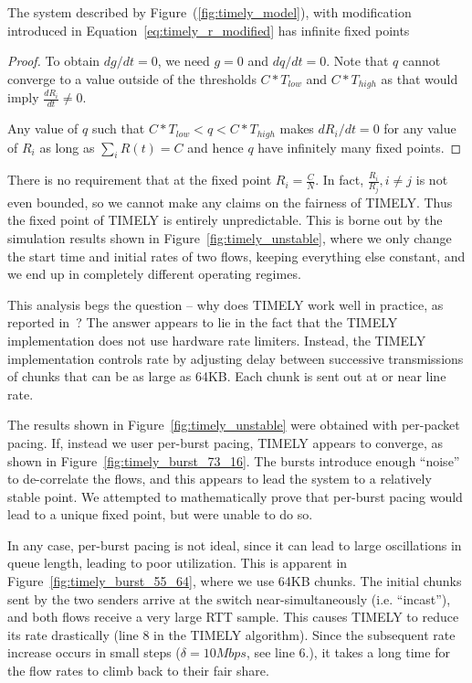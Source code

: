 \begin{thm}
The system described by Figure~(\ref{fig:timely_model}), with
modification introduced in Equation~\ref{eq:timely_r_modified} has
infinite fixed points
\end{thm}
\begin{proof}
To obtain ${dg}/{dt} =0$, we need $g = 0$ and ${dq}/{dt} = 0$.  Note that $q$
cannot converge to a value outside of the thresholds $ C*{T_{low}}$ and
$C*{T_{high}}$ as that would imply $\frac{dR_i}{dt} \ne 0$.

Any value of $q$ such that $C*T_{low} < q < C*T_{high}$ makes ${dR_i}/{dt} = 0$
for any value of $R_i$ as long as $\sum_{i} R(t) =  C$ and hence $q$ have
infinitely many fixed points. 
\end{proof}

There is no requirement that at the fixed point $R_i = \tfrac{C}{N}$. In fact,
$\tfrac{R_{i}}{R_{j}}, i \ne j$ is not even bounded, so we cannot make any
claims on the fairness of TIMELY. Thus the fixed point of TIMELY is entirely
unpredictable. This is borne out by the simulation results shown in
Figure~\ref{fig:timely_unstable}, where we only change the start time and
initial rates of two flows, keeping everything else constant, and we end up in
completely different operating regimes.

This analysis begs the question -- why does TIMELY work well in practice, as
reported in~\cite{timely}? The answer appears to lie in the fact that the TIMELY
implementation does not use hardware rate limiters.  Instead, the TIMELY
implementation controls rate by adjusting delay between successive transmissions
of chunks that can be as large as 64KB. Each chunk is sent out at or near line rate.

The results shown in Figure~\ref{fig:timely_unstable} were obtained with
per-packet pacing. If, instead we user per-burst pacing, TIMELY appears to
converge, as shown in Figure~\ref{fig:timely_burst_73_16}. The bursts introduce
enough ``noise'' to de-correlate the flows, and this appears to lead the system
to a relatively stable point. We attempted to mathematically prove that
per-burst pacing would lead to a unique fixed point, but were unable to do so.

In any case, per-burst pacing is not ideal, since it can lead to large
oscillations in queue length, leading to poor utilization. This is apparent in
Figure~\ref{fig:timely_burst_55_64}, where we use 64KB chunks. The initial chunks sent by the
two senders arrive at the switch near-simultaneously (i.e. ``incast''), and both
flows receive a very large RTT sample. This causes TIMELY to reduce its rate
drastically (line 8 in the TIMELY algorithm). Since the subsequent rate increase
occurs in small steps ($\delta = 10Mbps$, see line 6.), it takes a long time for
the flow rates to climb back to their fair share. 

